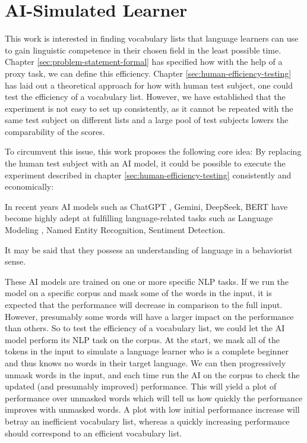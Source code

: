 \section{AI-Simulated Learner} \label{sec:ai-simulated-learner}

This work is interested in finding vocabulary lists that language learners can use to gain linguistic competence in their chosen field in the least possible time.
Chapter \ref{sec:problem-statement-formal} has specified how with the help of a proxy task, we can define this efficiency.
Chapter \ref{sec:human-efficiency-testing} has laid out a theoretical approach for how with human test subject, one could test the efficiency of a vocabulary list.
However, we have established that the experiment is not easy to set up consistently, as it cannot be repeated with the same test subject on different lists and a large pool of test subjects lowers the comparability of the scores.

To circumvent this issue, this work proposes the following core idea:
By replacing the human test subject with an AI model, it could be possible to execute the experiment described in chapter \ref{sec:human-efficiency-testing} consistently and economically:

In recent years AI models such as ChatGPT , Gemini, DeepSeek, BERT have become highly adept at fulfilling language-related tasks such as Language Modeling , Named Entity Recognition, Sentiment Detection.

It may be said that they possess an understanding of language in a behaviorist sense.

These AI models are trained on one or more specific NLP tasks.
If we run the model on a specific corpus and mask some of the words in the input, it is expected that the performance will decrease in comparison to the full input.
However, presumably some words will have a larger impact on the performance than others.
So to test the efficiency of a vocabulary list, we could let the AI model perform its NLP task on the corpus.
At the start, we mask all of the tokens in the input to simulate a language learner who is a complete beginner and thus knows no words in their target language.
We can then progressively unmask words in the input, and each time run the AI on the corpus to check the updated (and presumably improved) performance.
This will yield a plot of performance over unmasked words which will tell us how quickly the performance improves with unmasked words.
A plot with low initial performance increase will betray an inefficient vocabulary list, whereas a quickly increasing performance should correspond to an efficient vocabulary list.

